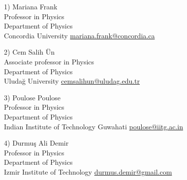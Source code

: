 \documentclass[]{friggeri-cv}
\begin{document}
	\begin{entrylist}
		
		\entry
		{1)}
		{Mariana Frank \\ \normalfont
			Professor in Physics \\
			Department of Physics \\
			Concordia University}
		{\href{mariana.frank@concordia.ca}{mariana.frank@concordia.ca}} 
		
	    \entry
		{2)}
		{Cem Salih Ün  \\ \normalfont
		Associate professor in Physics \\
		Department of Physics \\
		Uludağ University}
		{\href{cemsalihun@uludag.edu.tr}{cemsalihun@uludag.edu.tr}} 
	

		\entry
		{3)}
		{Poulose Poulose \\ \normalfont
		Professor in Physics \\
		Department of Physics \\
		Indian Institute of Technology Guwahati}
		{\href{poulose@iitg.ac.in}{poulose@iitg.ac.in}} 

	
		\entry
		{4)}
		{Durmuş Ali Demir \\ \normalfont
		Professor in Physics \\
		Department of Physics \\
		Izmir Institute of Technology}
		{\href{durmus.demir@gmail.com}{durmus.demir@gmail.com}} 
		
		

		

	\end{entrylist}
\end{document}
